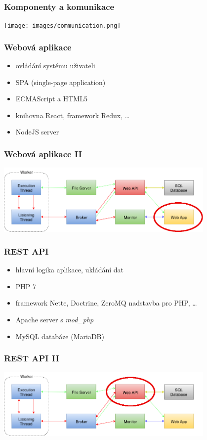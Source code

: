 \documentclass{beamer}
\begin{document}
\begin{frame}
	\frametitle{Komponenty a komunikace}
	\begin{center}
		\texttt{[image: images/communication.png]}
	\end{center}
\end{frame}

\begin{frame}
	\frametitle{Webová aplikace}
	\begin{itemize}
		\item ovládání systému uživateli
		\item SPA (single-page application)
		\item ECMAScript a HTML5
		\item knihovna React, framework Redux, \dots
		\item NodeJS server
	\end{itemize}
\end{frame}

\begin{frame}
	\frametitle{Webová aplikace II}
	\begin{center}
		\includegraphics[width=0.8\textwidth]{images/communication-webapp.png}
	\end{center}
\end{frame}

\begin{frame}
	\frametitle{REST API}
	\begin{itemize}
		\item hlavní logika aplikace, ukládání dat
		\item PHP 7
		\item framework Nette, Doctrine, ZeroMQ nadstavba pro PHP, \dots
		\item Apache server s {\it mod\_php}
		\item MySQL databáze (MariaDB)
	\end{itemize}
\end{frame}

\begin{frame}
	\frametitle{REST API II}
	\begin{center}
		\includegraphics[width=0.8\textwidth]{images/communication-webapi.png}
	\end{center}
\end{frame}
\end{document}
